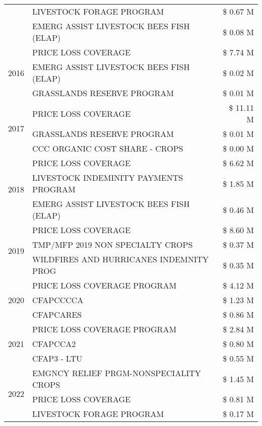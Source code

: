 \begin{tabular}{llr}
 & LIVESTOCK FORAGE PROGRAM & \$ 0.67 M \\
 & EMERG ASSIST LIVESTOCK BEES FISH (ELAP) & \$ 0.08 M \\
\cline{1-3}
\multirow[t]{3}{*}{2016} & PRICE LOSS COVERAGE & \$ 7.74 M \\
 & EMERG ASSIST LIVESTOCK BEES FISH (ELAP) & \$ 0.02 M \\
 & GRASSLANDS RESERVE PROGRAM & \$ 0.01 M \\
\cline{1-3}
\multirow[t]{3}{*}{2017} & PRICE LOSS COVERAGE & \$ 11.11 M \\
 & GRASSLANDS RESERVE PROGRAM & \$ 0.01 M \\
 & CCC ORGANIC COST SHARE - CROPS & \$ 0.00 M \\
\cline{1-3}
\multirow[t]{3}{*}{2018} & PRICE LOSS COVERAGE & \$ 6.62 M \\
 & LIVESTOCK INDEMINITY PAYMENTS PROGRAM & \$ 1.85 M \\
 & EMERG ASSIST LIVESTOCK BEES FISH (ELAP) & \$ 0.46 M \\
\cline{1-3}
\multirow[t]{3}{*}{2019} & PRICE LOSS COVERAGE & \$ 8.60 M \\
 & TMP/MFP 2019 NON SPECIALTY CROPS & \$ 0.37 M \\
 & WILDFIRES AND HURRICANES INDEMNITY PROG & \$ 0.35 M \\
\cline{1-3}
\multirow[t]{3}{*}{2020} & PRICE LOSS COVERAGE PROGRAM & \$ 4.12 M \\
 & CFAPCCCCA & \$ 1.23 M \\
 & CFAPCARES & \$ 0.86 M \\
\cline{1-3}
\multirow[t]{3}{*}{2021} & PRICE LOSS COVERAGE PROGRAM & \$ 2.84 M \\
 & CFAPCCA2 & \$ 0.80 M \\
 & CFAP3 - LTU & \$ 0.55 M \\
\cline{1-3}
\multirow[t]{3}{*}{2022} & EMGNCY RELIEF PRGM-NONSPECIALITY CROPS & \$ 1.45 M \\
 & PRICE LOSS COVERAGE & \$ 0.81 M \\
 & LIVESTOCK FORAGE PROGRAM & \$ 0.17 M \\
\cline{1-3}
\bottomrule
\end{tabular}
